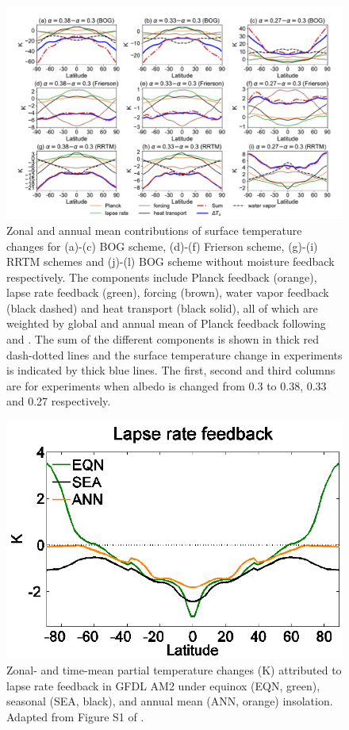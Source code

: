 

\begin{figure}[ht]
	\centering
	\includegraphics[width=1.0\linewidth]{figs/polar_amp/delta_ts_decomp}
	\caption{Zonal and annual mean contributions of surface temperature changes for (a)-(c) BOG scheme, (d)-(f) Frierson scheme, (g)-(i) RRTM schemes and (j)-(l) BOG scheme without moisture feedback respectively. The components include Planck feedback (orange), lapse rate feedback (green), forcing (brown), water vapor feedback (black dashed) and heat transport (black solid), all of which are weighted by global and annual mean of Planck feedback following \cite{Feldl2013a} and \cite{Kim2018}. The sum of the different components is shown in thick red dash-dotted lines and the surface temperature change in experiments is indicated by thick blue lines. The first, second and third columns are for experiments when albedo is changed from 0.3 to 0.38, 0.33 and 0.27 respectively.}
	\label{fig:delta_ts_decomp} 
\end{figure}


\begin{figure}[ht] %
	\centering
	\includegraphics[width=.6\linewidth]{figs/polar_amp/Kim2018_lapserate}
	\caption{Zonal- and time-mean partial temperature changes (K) attributed to lapse rate feedback in GFDL AM2 under equinox (EQN, green), seasonal (SEA, black), and annual mean (ANN, orange) insolation. Adapted from Figure S1 of \cite{Kim2018}.}
	\label{fig:kim2018_lapserate}
\end{figure}

